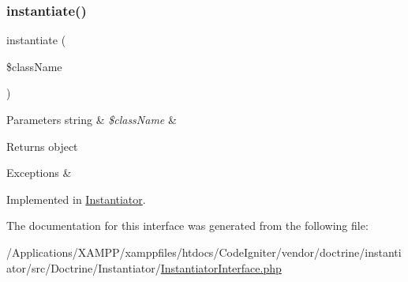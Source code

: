 \subsubsection{\texorpdfstring{instantiate()}{instantiate()}}
{\footnotesize\ttfamily instantiate (\begin{DoxyParamCaption}\item[{}]{\$class\+Name }\end{DoxyParamCaption})}


\begin{DoxyParams}[1]{Parameters}
string & {\em \$class\+Name} & \\
\hline
\end{DoxyParams}
\begin{DoxyReturn}{Returns}
object
\end{DoxyReturn}

\begin{DoxyExceptions}{Exceptions}
{\em } & \\
\hline
\end{DoxyExceptions}


Implemented in \mbox{\hyperlink{class_doctrine_1_1_instantiator_1_1_instantiator_a6d0d1226a8effb59e4b94606195c33ac}{Instantiator}}.



The documentation for this interface was generated from the following file\+:\begin{DoxyCompactItemize}
\item 
/\+Applications/\+X\+A\+M\+P\+P/xamppfiles/htdocs/\+Code\+Igniter/vendor/doctrine/instantiator/src/\+Doctrine/\+Instantiator/\mbox{\hyperlink{_instantiator_interface_8php}{Instantiator\+Interface.\+php}}\end{DoxyCompactItemize}
